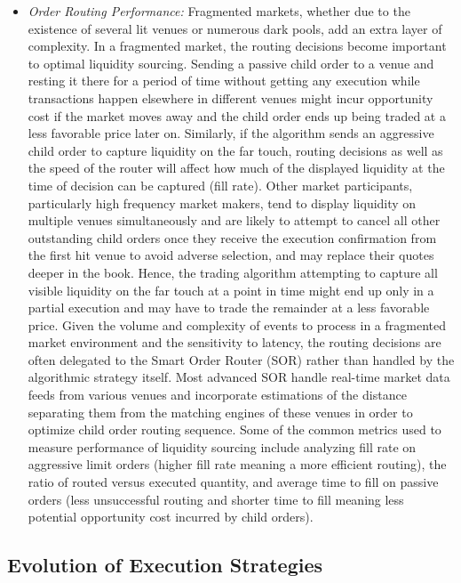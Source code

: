 \begin{itemize}
\item \emph{Order Routing Performance:} Fragmented markets, whether due to the existence of several lit venues or numerous dark pools, add an extra layer of complexity. In a fragmented market, the routing decisions become important to optimal liquidity sourcing. Sending a passive child order to a venue and resting it there for a period of time without getting any execution while transactions happen elsewhere in different venues might incur opportunity cost if the market moves away and the child order ends up being traded at a less favorable price later on. Similarly, if the algorithm sends an aggressive child order to capture liquidity on the far touch, routing decisions as well as the speed of the router will affect how much of the displayed liquidity at the time of decision can be captured (fill rate). Other market participants, particularly high frequency market makers, tend to display liquidity on multiple venues simultaneously and are likely to attempt to cancel all other outstanding child orders once they receive the execution confirmation from the first hit venue to avoid adverse selection, and may replace their quotes deeper in the book. Hence, the trading algorithm attempting to capture all visible liquidity on the far touch at a point in time might end up only in a partial execution and may have to trade the remainder at a less favorable price. Given the volume and complexity of events to process in a fragmented market environment and the sensitivity to latency, the routing decisions are often delegated to the Smart Order Router (SOR) rather than handled by the algorithmic strategy itself. Most advanced SOR handle real-time market data feeds from various venues and incorporate estimations of the distance separating them from the matching engines of these venues in order to optimize child order routing sequence. Some of the common metrics used to measure performance of liquidity sourcing include analyzing fill rate on aggressive limit orders (higher fill rate meaning a more efficient routing), the ratio of routed versus executed quantity, and average time to fill on passive orders (less unsuccessful routing and shorter time to fill meaning less potential opportunity cost incurred by child orders).

\end{itemize}

\subsection{Evolution of Execution Strategies}



